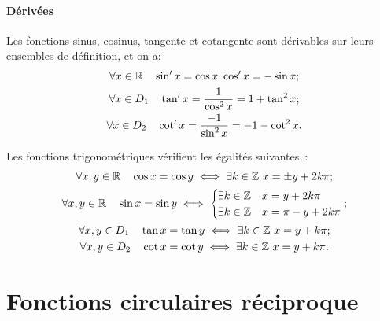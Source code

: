 \paragraph{Dérivées}
Les fonctions sinus, cosinus, tangente et cotangente sont dérivables sur leurs ensembles de définition, et on a:
\begin{gather}
\forall x \in \mathbb{R} \quad \sin'x=\cos x \ \cos'x=-\sin x; \\
\forall x \in D_1 \quad \tan'x=\frac{1}{\cos^2 x}=1+\tan^2 x; \\
\forall x \in D_2 \quad \cot'x=\frac{-1}{\sin^2 x}=-1-\cot^2 x.
\end{gather}
\begin{prop}
  Les fonctions trigonométriques vérifient les égalités suivantes~:
  \begin{gather}
    \forall x, y \in \R \quad \cos x = \cos y \iff \exists k \in \Z \ x=\pm y + 2k\pi;\\
    \forall x, y \in \R \quad \sin x = \sin y \iff \begin{cases} \exists k \in \Z & x = y + 2 k \pi \\ \exists k \in \Z & x = \pi - y + 2 k \pi\end{cases}; \\
    \forall x, y \in D_1 \quad \tan x = \tan y \iff \exists k \in \Z \ x = y + k \pi;\\
    \forall x, y \in D_2 \quad \cot x = \cot y \iff \exists k \in \Z \ x = y + k \pi.
  \end{gather}
\end{prop}

\section{Fonctions circulaires réciproque}
\label{sec:chap1-fonctionscircréciproques}
